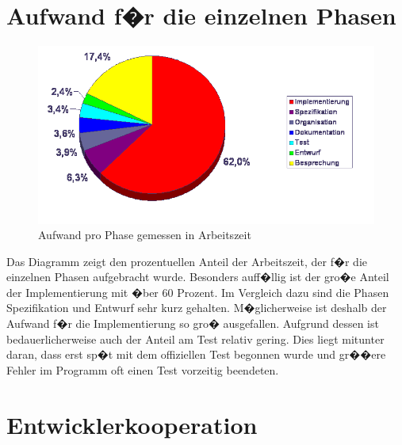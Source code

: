 \documentclass[a4paper,titlepage,12pt,ngerman]{scrbook}
\begin{document}
\section{Aufwand f�r die einzelnen Phasen}

\begin{figure}[h!]
  \centering
  \includegraphics[width=15cm]{praesentation/aufwand_pro_phase}
  \caption{Aufwand pro Phase gemessen in Arbeitszeit}
\end{figure}

Das Diagramm zeigt den prozentuellen Anteil der Arbeitszeit, der f�r die einzelnen
Phasen aufgebracht wurde. Besonders auff�llig ist der gro�e Anteil der Implementierung
mit �ber 60 Prozent. Im Vergleich dazu sind die Phasen Spezifikation und Entwurf 
sehr kurz gehalten. M�glicherweise ist deshalb der Aufwand f�r die Implementierung 
so gro� ausgefallen. Aufgrund dessen ist bedauerlicherweise auch der Anteil am 
Test relativ gering. Dies liegt mitunter daran, dass erst sp�t mit dem offiziellen Test
begonnen wurde und gr��ere Fehler im Programm oft einen Test vorzeitig beendeten.


\section{Entwicklerkooperation}
\label{developer by file}
\end{document}
